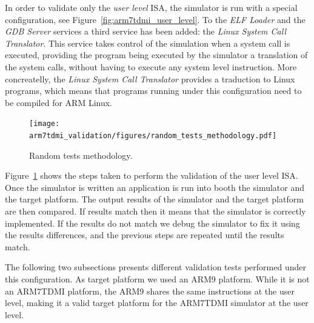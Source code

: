 In order to validate only the \textit{user level} ISA, the simulator is run with a special configuration, see Figure~\ref{fig:arm7tdmi_user_level}.
To the \textit{ELF Loader} and the \textit{GDB Server} services a third service has been added: the \textit{Linux System Call Translator}.
This service takes control of the simulation when a system call is executed, providing the program being executed by the simulator a translation of the system calls, without having to execute any system level instruction.
More concreatelly, the \textit{Linux System Call Translator} provides a traduction to Linux programs, which means that programs running under this configuration need to be compiled for ARM Linux.

\begin{figure}[!h]
	\begin{center}
		\texttt{[image: arm7tdmi\_validation/figures/random\_tests\_methodology.pdf]}
	\end{center}
	\caption{Random tests methodology.}
	\label{fig:random_tests_methodology}
\end{figure}

Figure~\ref{fig:random_tests_methodology} shows the steps taken to perform the validation of the user level ISA.
Once the simulator is written an application is run into booth the simulator and the target platform.
The output results of the simulator and the target platform are then compared.
If results match then it means that the simulator is correctly implemented.
If the results do not match we debug the simulator to fix it using the results differences, and the previous steps are repeated until the results match.

The following two subsections presents different validation tests performed under this configuration.
As target platform we used an ARM9 platform.
While it is not an ARM7TDMI platform, the ARM9 shares the same instructions at the user level, making it a valid target platform for the ARM7TDMI simulator at the user level.





